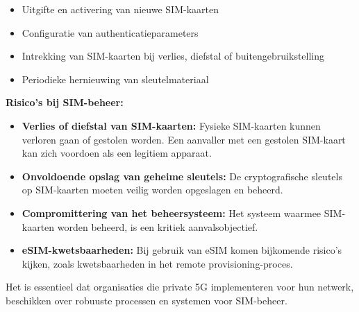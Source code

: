 \begin{itemize}
	\item Uitgifte en activering van nieuwe SIM-kaarten
	\item Configuratie van authenticatieparameters
	\item Intrekking van SIM-kaarten bij verlies, diefstal of buitengebruikstelling
	\item Periodieke hernieuwing van sleutelmateriaal
\end{itemize}

\textbf{Risico's bij SIM-beheer:}  

\begin{itemize}
	\item \textbf{Verlies of diefstal van SIM-kaarten:} Fysieke SIM-kaarten kunnen verloren gaan of gestolen worden. Een aanvaller met een gestolen SIM-kaart kan zich voordoen als een legitiem apparaat.
	\item \textbf{Onvoldoende opslag van geheime sleutels:} De cryptografische sleutels op SIM-kaarten moeten veilig worden opgeslagen en beheerd.
	\item \textbf{Compromittering van het beheersysteem:} Het systeem waarmee SIM-kaarten worden beheerd, is een kritiek aanvalsobjectief.
	\item \textbf{eSIM-kwetsbaarheden:} Bij gebruik van eSIM komen bijkomende risico's kijken, zoals kwetsbaarheden in het remote provisioning-proces.
\end{itemize}
\vspace{0.5cm}
Het is essentieel dat organisaties die private 5G implementeren voor hun netwerk, beschikken over robuuste processen en systemen voor SIM-beheer.
\vspace{0.5cm}
